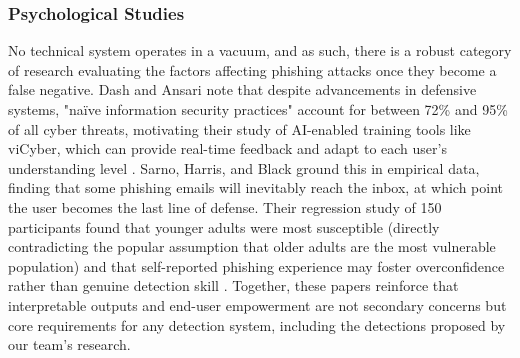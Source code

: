 \documentclass[conference]{IEEEtran}
\begin{document}
\subsubsection{Psychological Studies}
No technical system operates in a vacuum, and as such, there is a robust category of research evaluating the factors affecting phishing attacks once they become a false negative. Dash and Ansari \cite{dash1} note that despite advancements in defensive systems, "naïve information security practices" account for between 72\% and 95\% of all cyber threats, motivating their study of AI-enabled training tools like viCyber, which can provide real-time feedback and adapt to each user's understanding level \cite{dash1}. Sarno, Harris, and Black \cite{dawn_m_sarno_which_2023} ground this in empirical data, finding that some phishing emails will inevitably reach the inbox, at which point the user becomes the last line of defense. Their regression study of 150 participants found that younger adults were most susceptible (directly contradicting the popular assumption that older adults are the most vulnerable population) and that self-reported phishing experience may foster overconfidence rather than genuine detection skill \cite{dawn_m_sarno_which_2023}. Together, these papers reinforce that interpretable outputs and end-user empowerment are not secondary concerns but core requirements for any detection system, including the detections proposed by our team's research.
\end{document}
